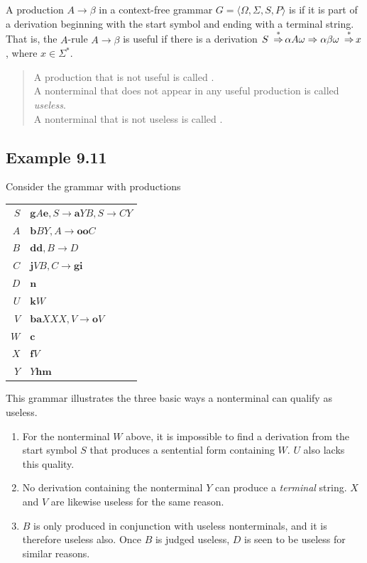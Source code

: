 \begin{dfn}\label{dfn-9.7}
A production $A\rightarrow\beta$ in a context-free grammar $G=\langle\Omega,
\Sigma,S,P\rangle$ is \emph{} if it is part of a derivation
beginning with the start symbol and ending with a terminal string. That is, the
$A$-rule $A\rightarrow\beta$ is useful if there is a derivation $S\ \DRightarrow
\alpha A\omega\Rightarrow\alpha\beta\omega\ \DRightarrow x$, where $x\in\Sigma^*$.

\begin{quote}
A production that is not useful is called \emph{}. \\
A nonterminal that does not appear in any useful production is called
	\emph{useless}. \\
A nonterminal that is not useless is called \emph{}.
\end{quote}
\end{dfn}

\subsection*{Example 9.11}

Consider the grammar with productions
\begin{center}\begin{tabular}{r@{ $\rightarrow$ }l}
$S$ & $\pmb{g}A\pmb{e}, S\rightarrow\pmb{a}YB, S\rightarrow CY$ \\
$A$ & $\pmb{b}BY, A\rightarrow\pmb{oo}C$ \\
$B$ & $\pmb{dd}, B\rightarrow D$ \\
$C$ & $\pmb{j}VB, C\rightarrow\pmb{gi}$ \\
$D$ & $\pmb{n}$ \\
$U$ & $\pmb{k}W$ \\
$V$ & $\pmb{ba}XXX, V\rightarrow\pmb{o}V$ \\
$W$ & $\pmb{c}$ \\
$X$ & $\pmb{f}V$ \\
$Y$ & $Y\pmb{hm}$
\end{tabular}\end{center}
This grammar illustrates the three basic ways a nonterminal can qualify as
useless.
\begin{enumerate}
\item For the nonterminal $W$ above, it is impossible to find a derivation from
the start symbol $S$ that produces a sentential form containing $W$. $U$ also
lacks this quality.
\item No derivation containing the nonterminal $Y$ can produce a \emph{terminal}
string. $X$ and $V$ are likewise useless for the same reason.
\item $B$ is only produced in conjunction with useless nonterminals, and it is
therefore useless also. Once $B$ is judged useless, $D$ is seen to be useless
for similar reasons.
\end{enumerate}

